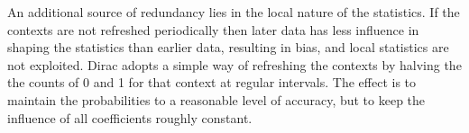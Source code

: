 An additional source of redundancy lies in the local nature of the
statistics. If the contexts are not refreshed periodically then later
data has less influence in shaping the statistics than earlier data,
resulting in bias, and local statistics are not exploited. Dirac adopts
a simple way of refreshing the contexts by halving the the counts of 0
and 1 for that context at regular intervals. The effect is to maintain
the probabilities to a reasonable level of accuracy, but to keep the
influence of all coefficients roughly constant.
